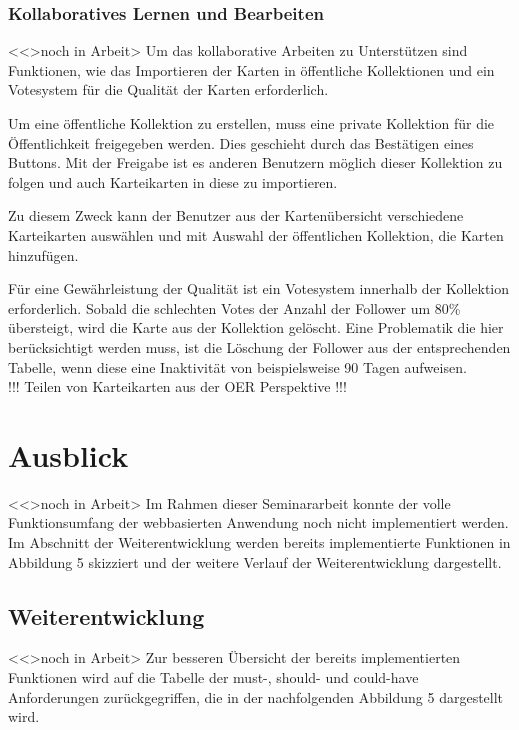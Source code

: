\subsubsection{Kollaboratives Lernen und Bearbeiten}
<<>noch in Arbeit>
Um das kollaborative Arbeiten zu Unterstützen sind Funktionen, wie das Importieren der Karten in öffentliche Kollektionen und ein Votesystem für die Qualität der Karten erforderlich. 

Um eine öffentliche Kollektion zu erstellen, muss eine private Kollektion für die Öffentlichkeit freigegeben werden. Dies geschieht durch das Bestätigen eines Buttons. Mit der Freigabe ist es anderen Benutzern möglich dieser Kollektion zu folgen und auch Karteikarten in diese zu importieren. 

Zu diesem Zweck kann der Benutzer aus der Kartenübersicht verschiedene Karteikarten auswählen und mit Auswahl der öffentlichen Kollektion, die Karten hinzufügen. 

Für eine Gewährleistung der Qualität ist ein Votesystem innerhalb der Kollektion erforderlich. Sobald die schlechten Votes der Anzahl der Follower um 80{\%} übersteigt, wird die Karte aus der Kollektion gelöscht. Eine Problematik die hier berücksichtigt werden muss, ist die Löschung der Follower aus der entsprechenden Tabelle, wenn diese eine Inaktivität von beispielsweise 90 Tagen aufweisen. \\

!!! Teilen von Karteikarten aus der OER Perspektive !!!

\section{Ausblick}
<<>noch in Arbeit>
Im Rahmen dieser Seminararbeit konnte der volle Funktionsumfang der webbasierten Anwendung noch nicht implementiert werden. Im Abschnitt der Weiterentwicklung werden bereits implementierte Funktionen in Abbildung 5 skizziert und der weitere Verlauf der Weiterentwicklung dargestellt. 

\subsection{Weiterentwicklung}
<<>noch in Arbeit>
Zur besseren Übersicht der bereits implementierten Funktionen wird auf die Tabelle der must-, should- und could-have Anforderungen zurückgegriffen, die in der nachfolgenden Abbildung 5 dargestellt wird.





